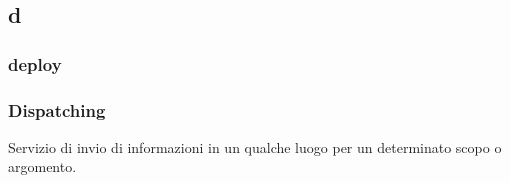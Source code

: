 \subsection*{\textbf{\hfill \Huge{d} \hfill}} 
\subsubsection*{deploy}

\subsubsection*{Dispatching}
Servizio di invio di informazioni in un qualche luogo per un determinato scopo o argomento.
